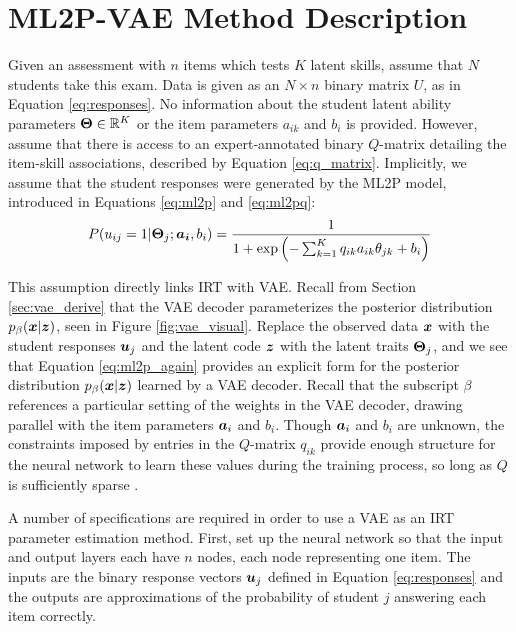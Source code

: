 \section{ML2P-VAE Method Description}\label{sec:ml2p_vae}
Given an assessment with $n$ items which tests $K$ latent skills, assume that $N$ students take this exam. Data is given as an $N \times n$ binary matrix $U$, as in Equation \ref{eq:responses}. No information about the student latent ability parameters $\boldsymbol{\Theta} \in \mathbb{R}^K$ or the item parameters $a_{ik}$ and $b_i$ is provided. However, assume that there is access to an expert-annotated binary $Q$-matrix detailing the item-skill associations, described by Equation \ref{eq:q_matrix}. Implicitly, we assume that the student responses were generated by the ML2P model, introduced in Equations \ref{eq:ml2p} and \ref{eq:ml2pq}:
\begin{equation}
  P(u_{ij} = 1 | \boldsymbol{\Theta}_j; \boldsymbol{a_i}, b_i) = \frac{1}{1 + \exp\left(-\sum_{k=1}^K q_{ik} a_{ik} \theta_{jk} + b_i \right)}
  \label{eq:ml2p_again}
\end{equation}

This assumption directly links IRT with VAE. Recall from Section \ref{sec:vae_derive} that the VAE decoder parameterizes the posterior distribution $p_\beta(\boldsymbol{x} | \boldsymbol{z})$, seen in Figure \ref{fig:vae_visual}. Replace the observed data $\boldsymbol{x}$ with the student responses $\boldsymbol{u}_j$ and the latent code $\boldsymbol{z}$ with the latent traits $\boldsymbol{\Theta}_j$, and we see that Equation \ref{eq:ml2p_again} provides an explicit form for the posterior distribution $p_\beta(\boldsymbol{x} | \boldsymbol{z})$ learned by a VAE decoder. Recall that the subscript $\beta$ references a particular setting of the weights in the VAE decoder, drawing parallel with the item parameters $\boldsymbol{a}_i$ and $b_i$. Though $\boldsymbol{a}_i$ and $b_i$ are unknown, the constraints imposed by entries in the $Q$-matrix $q_{ik}$ provide enough structure for the neural network to learn these values during the training process, so long as $Q$ is sufficiently sparse \cite{jiang2018}.

A number of specifications are required in order to use a VAE as an IRT parameter estimation method. First, set up the neural network so that the input and output layers each have $n$ nodes, each node representing one item. The inputs are the binary response vectors $\boldsymbol{u}_j$ defined in Equation \ref{eq:responses} and the outputs are approximations of the probability of student $j$ answering each item correctly. 

